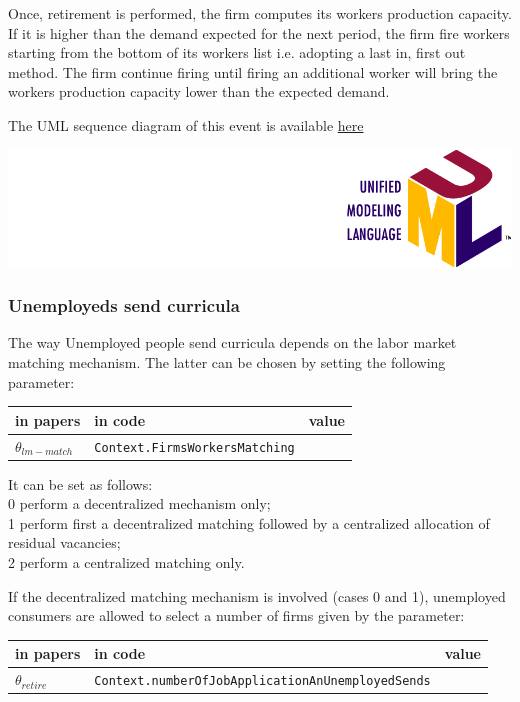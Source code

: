 \documentclass{book}
\newcommand{\umllocation}{file:///Users/giulioni/Dropbox/svn/sfcabm_my/documentation}
\begin{document}
Once, retirement is performed, the firm computes its workers production capacity.
If it is higher than the demand expected for the next period, the firm fire workers starting from the bottom of its workers list i.e. adopting a last in, first out method.
The firm continue firing until firing an additional worker will bring the workers production capacity lower than the expected demand.

\vskip3mm
The UML sequence diagram of this event is available \href{\umllocation/laborForceDownwardAdjustment.html}{here}
\begin{marginfigure}
	\includegraphics[scale=0.1]{uml.png}
\end{marginfigure}


\subsubsection{Unemployeds send curricula}

The way Unemployed people send curricula depends on the labor market matching mechanism. The latter can be chosen by setting the following parameter:\\

\vskip3mm
\noindent
\begin{tabular}{l l l}
	\hline
	in papers& in code&value\\
	\hline
	\hline
	$\theta_{lm-match}$&\verb+Context.FirmsWorkersMatching+&\\
	\hline
\end{tabular}

\vskip3mm
It can be set as follows:\\
0 perform a decentralized mechanism only;\\
1 perform first a decentralized matching followed by a centralized allocation of residual vacancies;\\
2 perform a centralized matching only.

If the decentralized matching mechanism is involved (cases 0 and 1), unemployed consumers are allowed to select a number of firms given by the parameter:

\vskip3mm
\noindent
\begin{tabular}{l l l}
	\hline
	in papers& in code&value\\
	\hline
	\hline
	$\theta_{retire}$&\verb+Context.numberOfJobApplicationAnUnemployedSends+&\\
	\hline
\end{tabular}
\end{document}
